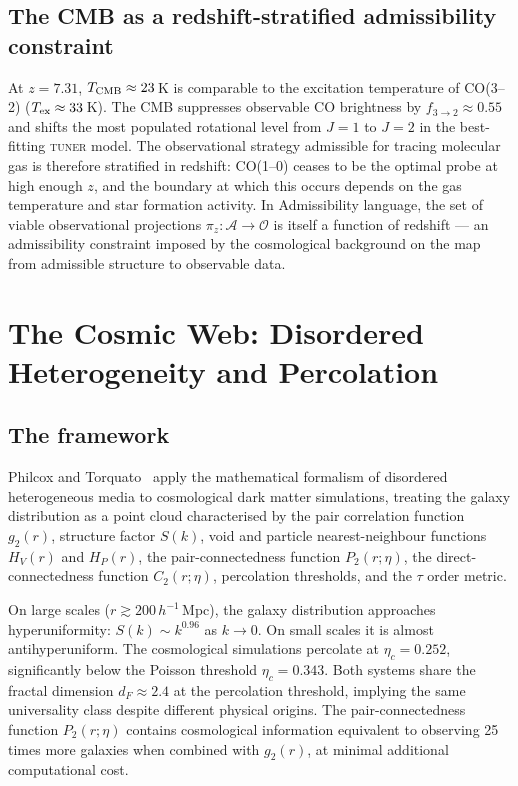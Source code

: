 \documentclass[12pt, oneside]{article}
\begin{document}
\subsection{The CMB as a redshift-stratified admissibility constraint}

At $z = 7.31$, $T_{\rm CMB} \approx 23$\,K is comparable to the excitation temperature of CO(3--2) ($T_{\rm ex} \approx 33$\,K). The CMB suppresses observable CO brightness by $f_{3\to 2} \approx 0.55$ and shifts the most populated rotational level from $J = 1$ to $J = 2$ in the best-fitting \textsc{tuner} model. The observational strategy admissible for tracing molecular gas is therefore stratified in redshift: CO(1--0) ceases to be the optimal probe at high enough $z$, and the boundary at which this occurs depends on the gas temperature and star formation activity. In Admissibility language, the set of viable observational projections $\pi_z : \mathcal{A} \to \mathcal{O}$ is itself a function of redshift --- an admissibility constraint imposed by the cosmological background on the map from admissible structure to observable data.

\section{The Cosmic Web: Disordered Heterogeneity and Percolation}

\subsection{The framework}

Philcox and Torquato~\cite{philcox2023} apply the mathematical formalism of disordered heterogeneous media to cosmological dark matter simulations, treating the galaxy distribution as a point cloud characterised by the pair correlation function $g_2(r)$, structure factor $S(k)$, void and particle nearest-neighbour functions $H_V(r)$ and $H_P(r)$, the pair-connectedness function $P_2(r;\eta)$, the direct-connectedness function $C_2(r;\eta)$, percolation thresholds, and the $\tau$ order metric.

On large scales ($r \gtrsim 200\,h^{-1}$\,Mpc), the galaxy distribution approaches hyperuniformity: $S(k) \sim k^{0.96}$ as $k \to 0$. On small scales it is almost antihyperuniform. The cosmological simulations percolate at $\eta_c = 0.252$, significantly below the Poisson threshold $\eta_c = 0.343$. Both systems share the fractal dimension $d_F \approx 2.4$ at the percolation threshold, implying the same universality class despite different physical origins. The pair-connectedness function $P_2(r;\eta)$ contains cosmological information equivalent to observing 25 times more galaxies when combined with $g_2(r)$, at minimal additional computational cost.
\end{document}

